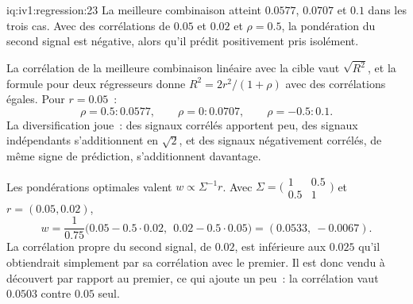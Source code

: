 \begin{solution}{iq:iv1:regression:23}
La meilleure combinaison atteint $0.0577$, $0.0707$ et $0.1$ dans les trois cas. Avec des corrélations de $0.05$ et $0.02$ et $\rho = 0.5$, la pondération du second signal est négative, alors qu'il prédit positivement pris isolément.

La corrélation de la meilleure combinaison linéaire avec la cible vaut $\sqrt{R^2}$, et la formule pour deux régresseurs donne $R^2 = 2r^2/(1 + \rho)$ avec des corrélations égales. Pour $r = 0.05$~:
\[
\rho = 0.5 : 0.0577, \qquad \rho = 0 : 0.0707, \qquad \rho = -0.5 : 0.1.
\]
La diversification joue~: des signaux corrélés apportent peu, des signaux indépendants s'additionnent en $\sqrt2$, et des signaux négativement corrélés, de même signe de prédiction, s'additionnent davantage.

Les pondérations optimales valent $w \propto \Sigma^{-1}r$. Avec $\Sigma = \bigl(\begin{smallmatrix}1 & 0.5\\ 0.5 & 1\end{smallmatrix}\bigr)$ et $r = (0.05, 0.02)$,
\[
w = \frac{1}{0.75}\bigl(0.05 - 0.5 \cdot 0.02,\ \ 0.02 - 0.5 \cdot 0.05\bigr) = (0.0533,\ -0.0067).
\]
La corrélation propre du second signal, de $0.02$, est inférieure aux $0.025$ qu'il obtiendrait simplement par sa corrélation avec le premier. Il est donc vendu à découvert par rapport au premier, ce qui ajoute un peu~: la corrélation vaut $0.0503$ contre $0.05$ seul.

\end{solution}

